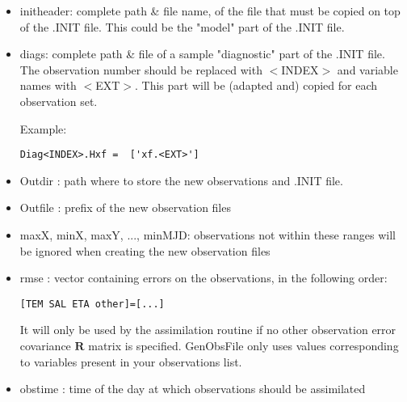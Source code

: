 \documentclass[a4paper,12pt]{article}
\begin{document}
\begin{itemize}
\item initheader: complete path \& file name, of the file that must be copied on top of the .INIT file. This could be the "model" part of the .INIT file.

\item diags: complete path \& file of a sample "diagnostic" part of the .INIT file. The observation number should be replaced with $<$INDEX$>$ and variable names with $<$EXT$>$. This part will be (adapted and) copied for each 
observation set.

Example: 
\begin{verbatim}
Diag<INDEX>.Hxf =  ['xf.<EXT>']
\end{verbatim}

\item Outdir : path where to store the new observations and .INIT file.

\item Outfile : prefix of the new observation files

\item maxX, minX, maxY, ..., minMJD: observations not within these ranges will be ignored when creating the new observation files

\item rmse : vector containing errors on the observations, in the
  following order:

\begin{verbatim}
[TEM SAL ETA other]=[...]
\end{verbatim}
It will only be used by the assimilation routine if no other observation error covariance $\mathbf R$ matrix is specified. GenObsFile only uses values corresponding to variables present in your observations list.

\item obstime : time of the day at which observations should be assimilated


\end{itemize}
\end{document}
